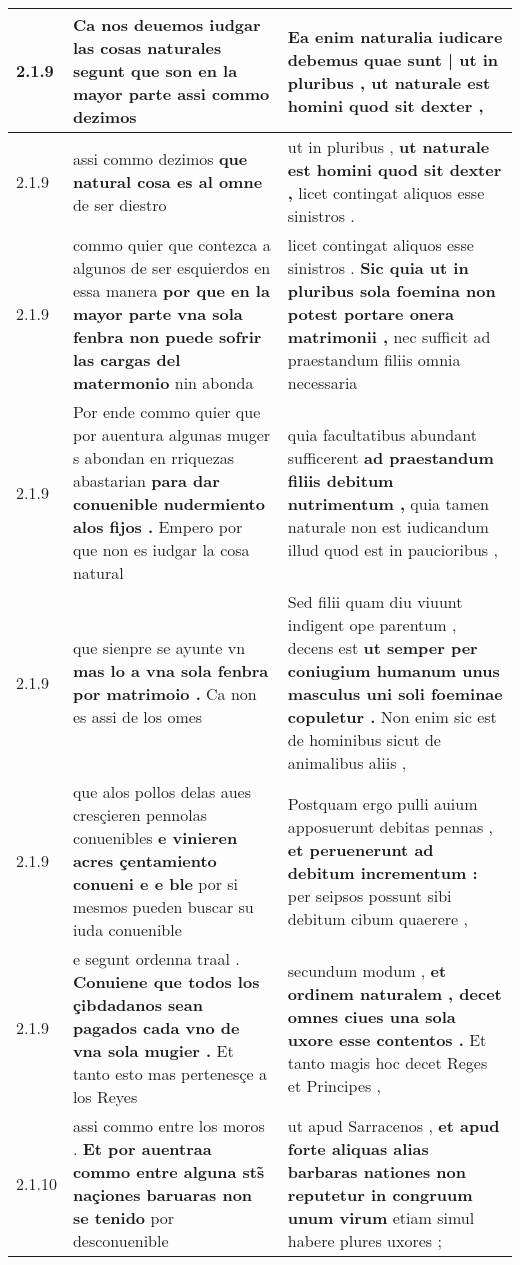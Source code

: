 \begin{tabular}{|p{1cm}|p{6.5cm}|p{6.5cm}|}
2.1.9 & Ca nos deuemos iudgar las cosas naturales \textbf{ segunt que son en la mayor parte } assi commo dezimos & Ea enim naturalia iudicare debemus \textbf{ quae sunt | ut in pluribus , } ut naturale est homini quod sit dexter , \\\hline
2.1.9 & assi commo dezimos \textbf{ que natural cosa es al omne } de ser diestro & ut in pluribus , \textbf{ ut naturale est homini quod sit dexter , } licet contingat aliquos esse sinistros . \\\hline
2.1.9 & commo quier que contezca a algunos de ser esquierdos en essa manera \textbf{ por que en la mayor parte vna sola fenbra non puede sofrir las cargas del matermonio } nin abonda & licet contingat aliquos esse sinistros . \textbf{ Sic quia ut in pluribus sola foemina non potest portare onera matrimonii , } nec sufficit ad praestandum filiis omnia necessaria \\\hline
2.1.9 & Por ende commo quier que por auentura algunas muger s abondan en rriquezas abastarian \textbf{ para dar conuenible nudermiento alos fijos . } Empero por que non es iudgar la cosa natural & quia facultatibus abundant sufficerent \textbf{ ad praestandum filiis debitum nutrimentum , } quia tamen naturale non est iudicandum illud quod est in paucioribus , \\\hline
2.1.9 & que sienpre se ayunte vn \textbf{ mas lo a vna sola fenbra por matrimoio . } Ca non es assi de los omes & Sed filii quam diu viuunt indigent ope parentum , decens est \textbf{ ut semper per coniugium humanum unus masculus uni soli foeminae copuletur . } Non enim sic est de hominibus sicut de animalibus aliis , \\\hline
2.1.9 & que alos pollos delas aues cresçieren pennolas conuenibles \textbf{ e vinieren acres çentamiento conueni e e ble } por si mesmos pueden buscar su iuda conuenible & Postquam ergo pulli auium apposuerunt debitas pennas , \textbf{ et peruenerunt ad debitum incrementum : } per seipsos possunt sibi debitum cibum quaerere , \\\hline
2.1.9 & e segunt ordenna traal . \textbf{ Conuiene que todos los çibdadanos sean pagados cada vno de vna sola mugier . } Et tanto esto mas pertenesçe a los Reyes & secundum modum , \textbf{ et ordinem naturalem , decet omnes ciues una sola uxore esse contentos . } Et tanto magis hoc decet Reges et Principes , \\\hline
2.1.10 & assi commo entre los moros . \textbf{ Et por auentraa commo entre alguna sts̃ naçiones baruaras non se tenido } por desconuenible & ut apud Sarracenos , \textbf{ et apud forte aliquas alias barbaras nationes non reputetur in congruum unum virum } etiam simul habere plures uxores ; \\\hline

\end{tabular}
